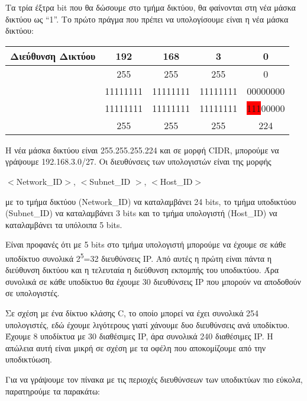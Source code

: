 Τα τρία έξτρα bit που θα δώσουμε στο τμήμα δικτύου, θα φαίνονται στη νέα μάσκα δικτύου ως ``1''. Το πρώτο πράγμα που πρέπει να υπολογίσουμε είναι η νέα μάσκα δικτύου:

\begin{center}
\fontsize{11}{13}
\ttfamily
\begin{tabular}{|c|c|c|c|c|}
\hline
 \textbf{Διεύθυνση Δικτύου} & 192 & 168 & 3 & 0 \\ 
\hline
\multirow{2}{*}{} \textbf{Παλιά Μάσκα} & 255 & 255 & 255  & 0 \\ 
\cline{2-5} 
              \textbf{Δικτύου} & 11111111  & 11111111 & 11111111 & 00000000 \\ 
\hline
\multirow{2}{*}{} \textbf{Νέα Μάσκα} & 11111111 & 11111111 & 11111111 & \colorbox{red}{111}00000  \\ 
\cline{2-5} 
             \textbf{Υποδικτύου} & 255 & 255 & 255 & 224 \\ 
\hline
\end{tabular}
\normalfont
\end{center}

Η νέα μάσκα δικτύου είναι 255.255.255.224 και σε μορφή CIDR, μπορούμε να γράψουμε 192.168.3.0/27. Οι διευθύνσεις των υπολογιστών είναι της μορφής

$<$Network\_ID$>$, $<$Subnet\_ID $>$, $<$Host\_ID$>$

με το τμήμα δικτύου (Network\_ID) να καταλαμβάνει 24 bits, το τμήμα υποδικτύου (Subnet\_ID) να καταλαμβάνει 3 bits και το τμήμα υπολογιστή (Host\_ID) να καταλαμβάνει τα υπόλοιπα 5 bits.

Είναι προφανές ότι με 5 bits στο τμήμα υπολογιστή μπορούμε να έχουμε σε κάθε υποδίκτυο συνολικά 2\textsuperscript{5}=32 διευθύνσεις IP. Από αυτές η πρώτη είναι πάντα η διεύθυνση δικτύου και η τελευταία η διεύθυνση εκπομπής του υποδικτύου. Άρα συνολικά σε κάθε υποδίκτυο θα έχουμε 30 διευθύνσεις IP που μπορούν να αποδοθούν σε υπολογιστές.

Σε σχέση με ένα δίκτυο κλάσης C, το οποίο μπορεί να έχει συνολικά 254 υπολογιστές, εδώ έχουμε λιγότερους γιατί χάνουμε δυο διευθύνσεις ανά υποδίκτυο. Έχουμε 8 υποδίκτυα με 30 διαθέσιμες IP, άρα συνολικά 240 διαθέσιμες IP. Η απώλεια αυτή είναι μικρή σε σχέση με τα οφέλη που αποκομίζουμε από την υποδικτύωση.

Για να γράψουμε τον πίνακα με τις περιοχές διευθύνσεων των υποδικτύων πιο εύκολα, παρατηρούμε τα παρακάτω:

